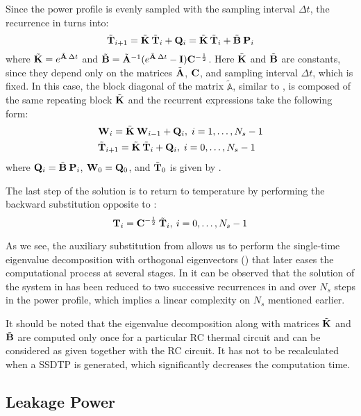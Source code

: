 Since the power profile is evenly sampled with the sampling interval $\Delta t$,
the recurrence in  turns into:
\[
  \tilde{\mathbf{T}}_{i+1} = \tilde{\mathbf{K}} \: \tilde{\mathbf{T}}_i + \mathbf{Q}_i = \tilde{\mathbf{K}} \: \tilde{\mathbf{T}}_i + \tilde{\mathbf{B}} \: \mathbf{P}_i
\]
where $\tilde{\mathbf{K}} = e^{\tilde{\mathbf{A}} \: \Delta t}$ and $\tilde{\mathbf{B}} = \tilde{\mathbf{A}}^{-1} ( e^{\tilde{\mathbf{A}} \:
\Delta t} - \mathbf{I} ) \mathbf{C}^{-\frac{1}{2}}$. Here $\tilde{\mathbf{K}}$ and $\tilde{\mathbf{B}}$ are
constants, since they depend only on the matrices $\tilde{\mathbf{A}}$, $\mathbf{C}$, and
sampling interval $\Delta t$, which is fixed. In this case, the block diagonal
of the matrix $\tilde{\mathbb{A}}$, similar to , is composed of the
same repeating block $\tilde{\mathbf{K}}$ and the recurrent expressions take the following
form:
\begin{align}
  & \m{W}_i = \tm{K} \: \m{W}_{i - 1} + \m{Q}_i, \; i = \range{1}{N_s - 1} \elab{final-p-recurrence} \\
  & \tv{T}_{i + 1} = \tm{K} \: \tv{T}_i + \m{Q}_i, \; i = \range{0}{N_s - 1} \elab{final-y-recurrence}
\end{align}
where $\mathbf{Q}_i = \tilde{\mathbf{B}} \: \mathbf{P}_i$, $\mathbf{W}_0 = \mathbf{Q}_0$, and $\tilde{\mathbf{T}}_0$ is
given by .

The last step of the solution is to return to temperature by performing the
backward substitution opposite to :
\[
  \mathbf{T}_i = \mathbf{C}^{-\frac{1}{2}} \: \tilde{\mathbf{T}}_i, \: i = 0, \dots, N_s - 1
\]

As we see, the auxiliary substitution from  allows us to
perform the single-time eigenvalue decomposition with orthogonal eigenvectors
() that later eases the computational process at
several stages. In  it can be observed that the solution of
the system in  has been reduced to two successive recurrences in
 and  over $N_s$ steps in the
power profile, which implies a linear complexity on $N_s$ mentioned earlier.

It should be noted that the eigenvalue decomposition along with matrices
$\tilde{\mathbf{K}}$ and $\tilde{\mathbf{B}}$ are computed only once for a particular RC thermal circuit
and can be considered as given together with the RC circuit. It has not to be
recalculated when a SSDTP is generated, which significantly decreases the
computation time.

\subsection{Leakage Power}

